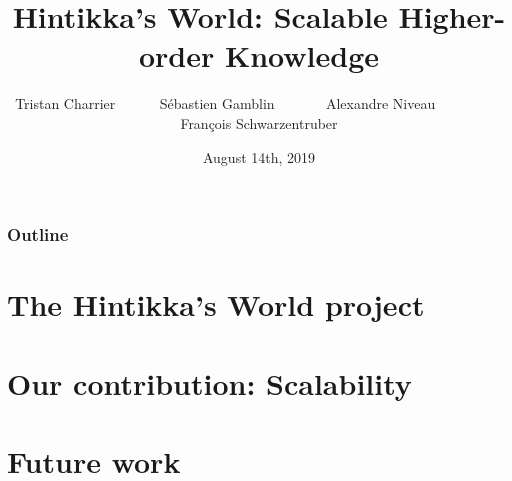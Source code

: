 \documentclass[10pt]{beamer}
\title{Hintikka's World: Scalable Higher-order Knowledge}%
\author{Tristan Charrier ~~~~~ Sébastien Gamblin ~~~~~~ Alexandre Niveau ~~~~~~~~~ François Schwarzentruber}
\institute{\texttt{[image: logoens.png]} \\ École Normale Supérieure Rennes}
\date{August 14th, 2019}
\begin{document}
\begin{frame}
\titlepage
\end{frame}



\begin{frame}
\frametitle{Outline}
\tableofcontents[hideallsubsections]
\end{frame}

\section{The Hintikka's World project}


\section{Our contribution: Scalability}


\section{Future work}


%
%
%
%
%
%
%
%
\end{document}

